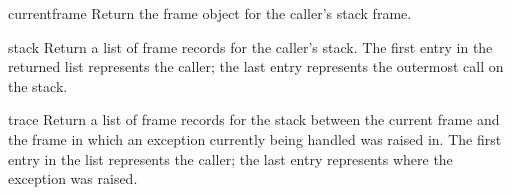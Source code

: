 \begin{funcdesc}{currentframe}{}
  Return the frame object for the caller's stack frame.
\end{funcdesc}

\begin{funcdesc}{stack}{}
  Return a list of frame records for the caller's stack.  The first
  entry in the returned list represents the caller; the last entry
  represents the outermost call on the stack.
\end{funcdesc}

\begin{funcdesc}{trace}{}
  Return a list of frame records for the stack between the current
  frame and the frame in which an exception currently being handled
  was raised in.  The first entry in the list represents the caller;
  the last entry represents where the exception was raised.
\end{funcdesc}
